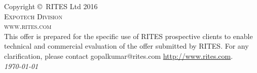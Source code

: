 \noindent Copyright \copyright\ RITES Ltd 2016\\ %

\noindent \textsc{Expotech Division}\\ %

\noindent \textsc{www.rites.com}\\ %

\noindent This offer is prepared for the specific use of RITES prospective clients to enable technical and commercial evaluation of the offer submitted by RITES.
For any clarification, please contact gopalkumar@rites.com  \url{http://www.rites.com}.\\ %

\noindent \textit{ \today} %

